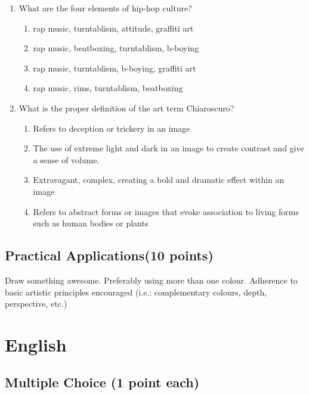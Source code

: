 \documentclass[11pt]{exam}
\begin{document}
\begin{questions}
\begin{enumerate}
\item What are the four elements of hip-hop culture?

\begin{enumerate}
\item rap music, turntablism, attitude, graffiti art
\item rap music, beatboxing, turntablism, b-boying
\item rap music, turntablism, b-boying,  graffiti art
\item rap music, rims, turntablism, beatboxing
\end{enumerate}




\item What is the proper definition of the art term Chiaroscuro?

\begin{enumerate}
\item Refers to deception or trickery in an image
\item The use of extreme light and dark in an image to create contrast and give a sense of volume.
\item Extravagant, complex, creating a bold and dramatic effect within an image
\item Refers to abstract forms or images that evoke association to living forms such as human bodies or plants
\end{enumerate}



\end{enumerate}



\subsection{Practical Applications(10 points)}
\setcounter{question}{0}
\question Draw something awesome. Preferably using more than one colour. Adherence to basic artistic principles encouraged (i.e.: complementary colours, depth, perspective, etc.)
\vfill




\newpage
\section{English}
\subsection{Multiple Choice (1 point each)}


\end{questions}
\end{document}
